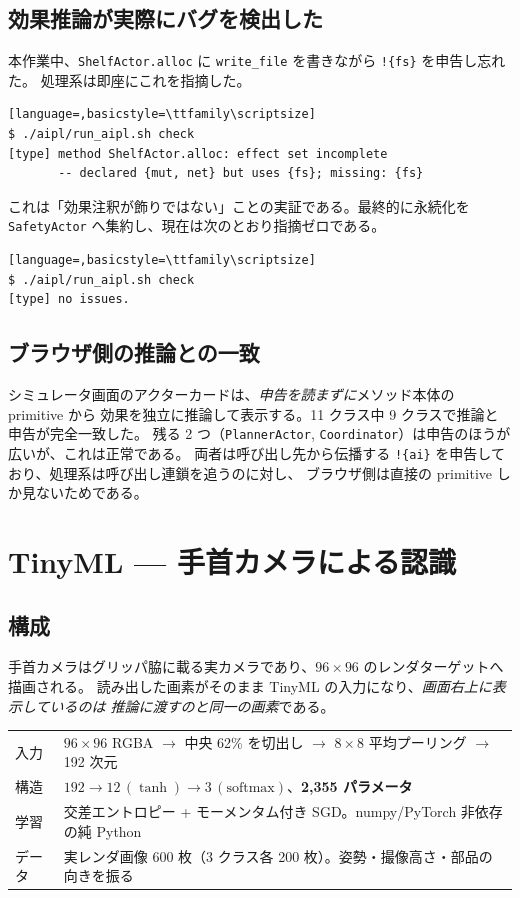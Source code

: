 \documentclass[11pt,a4paper]{article}
\newcommand{\eff}[1]{\texttt{!\{#1\}}}
\begin{document}
\subsection{効果推論が実際にバグを検出した}
本作業中、\texttt{ShelfActor.alloc} に \texttt{write\_file} を書きながら \eff{fs} を申告し忘れた。
処理系は即座にこれを指摘した。

\begin{lstlisting}[language=,basicstyle=\ttfamily\scriptsize]
$ ./aipl/run_aipl.sh check
[type] method ShelfActor.alloc: effect set incomplete
       -- declared {mut, net} but uses {fs}; missing: {fs}
\end{lstlisting}

\noindent
これは「効果注釈が飾りではない」ことの実証である。最終的に永続化を
\texttt{SafetyActor} へ集約し、現在は次のとおり指摘ゼロである。

\begin{lstlisting}[language=,basicstyle=\ttfamily\scriptsize]
$ ./aipl/run_aipl.sh check
[type] no issues.
\end{lstlisting}

\subsection{ブラウザ側の推論との一致}
シミュレータ画面のアクターカードは、\emph{申告を読まずに}メソッド本体の primitive から
効果を独立に推論して表示する。11 クラス中 9 クラスで推論と申告が完全一致した。
残る 2 つ（\texttt{PlannerActor}, \texttt{Coordinator}）は申告のほうが広いが、これは正常である。
両者は呼び出し先から伝播する \eff{ai} を申告しており、処理系は呼び出し連鎖を追うのに対し、
ブラウザ側は直接の primitive しか見ないためである。

\section{TinyML --- 手首カメラによる認識}

\subsection{構成}
手首カメラはグリッパ脇に載る実カメラであり、$96\times96$ のレンダターゲットへ描画される。
読み出した画素がそのまま TinyML の入力になり、\emph{画面右上に表示しているのは
推論に渡すのと同一の画素}である。

\begin{center}
\small
\begin{tabular}{@{}ll@{}}
\toprule
入力 & $96\times96$ RGBA $\to$ 中央 62\% を切出し $\to$ $8\times8$ 平均プーリング $\to$ 192 次元 \\
構造 & $192 \to 12\,(\tanh) \to 3\,(\mathrm{softmax})$、\textbf{2{,}355 パラメータ} \\
学習 & 交差エントロピー + モーメンタム付き SGD。numpy/PyTorch 非依存の純 Python \\
データ & 実レンダ画像 600 枚（3 クラス各 200 枚）。姿勢・撮像高さ・部品の向きを振る \\
\bottomrule
\end{tabular}
\end{center}
\end{document}
